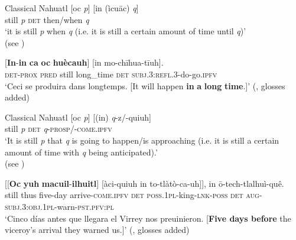 \begin{exe}
	\ex \label{exTimeSpanBeforeA}
	\begin{xlist}
		\exi{}Classical Nahuatl
		\ex\label{exTimeBeforePatternA}
		 \gll \textup{[}oc \textit{p}\textup{]} \textup{[}in (ìcuāc) \textit{q}\textup{]}\\
		\phantom{[}still \textit{p} \phantom{[}\textsc{det} \phantom{(}then/when \textit{q} \\
		\glt \lq it is still \textit{p} when \textit{q} (i.e. it is still a certain amount of time until \textit{q})'\\(see \cite[1268]{Launey1986})
	
	\ex\label{exTimeBeforePatternAex}
		\gll \textup{[}\textbf{In}-\textbf{in} \textbf{ca} \textbf{oc} \textbf{huècauh}\textup{]} \textup{[}in mo-chīhua-tīuh\textup{]}.\\
		\phantom{[}\textsc{det}-\textsc{prox} \textsc{pred} still long\_time \phantom{[}\textsc{det} \textsc{subj}.3:\textsc{refl}.3-do-go.\textsc{ipfv}\\
		\glt \lq Ceci se produira dans longtemps. [It will happen \textbf{in} \textbf{a} \textbf{long} \textbf{time}.]' (\cite[1268]{Launey1986},  glosses added)	
		\end{xlist}
	\ex \label{exTimeSpanBeforeB}
	\begin{xlist}
		\exi{}Classical Nahuatl
		\ex\label{exTimeBeforePatternB}
		\gll \textup{[}oc \textit{p}\textup{]} \textup{[}(in) \textit{q}-z\textup{/}-quiuh\textup{]}\\
		\phantom{[}still \textit{p} \phantom{[(}\textsc{det} \textit{q}-{\textsc{prosp}/-\textsc{come}.\textsc{ipfv}}\\
		\glt \lq It is still \textit{p} that \textit{q} is going to happen/is approaching (i.e. it is still a certain amount of time with \textit{q} being anticipated).\rq{}\\(see \cite[1268]{Launey1986})
	
		\ex\label{exTimeBeforePatternBex}	
		\gll \textup{[}\textup{[}\textbf{Oc} \textbf{yuh} \textbf{macuil}-\textbf{ilhuitl}\textup{]} \textup{[}àci-quiuh in to-tlàtò-ca-uh\textup{]}\textup{]}, in ō-tech-tlalhuì-quê.\\
	\phantom{[}\phantom{[}still thus five-day \phantom{[}arrive-\textsc{come}.\textsc{ipfv} \textsc{det} \textsc{poss}.1\textsc{pl}-king-\textsc{lnk}-\textsc{poss} \textsc{det}  \textsc{aug}-\textsc{subj}.3:\textsc{obj}.1\textsc{pl}-warn-\textsc{pst}.\textsc{pfv}:\textsc{pl}\\
		\glt \lq Cinco días antes que llegara el Virrey nos preuinieron. [\textbf{Five days before} the viceroy’s arrival they warned us.]'
		(\cite[501]{Carochi1645},  glosses added)
	\end{xlist}
\end{exe}	

